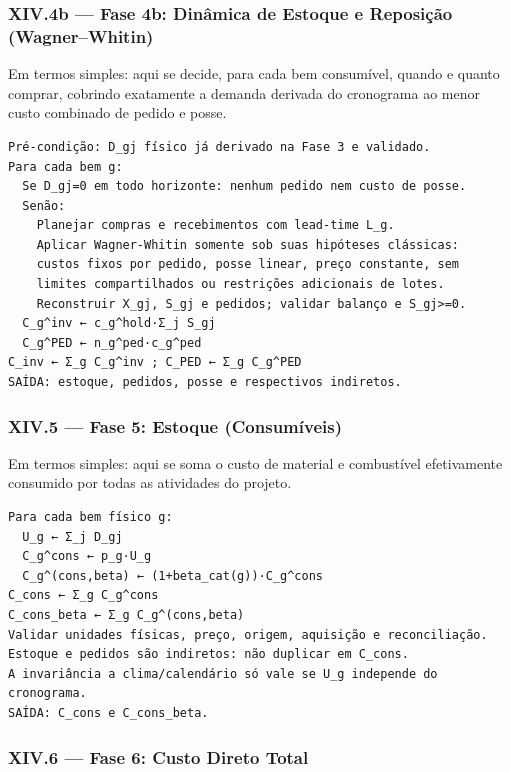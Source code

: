 \documentclass[
  10pt,
]{article}
\begin{document}
\hypertarget{xiv.4b-fase-4b-dinuxe2mica-de-estoque-e-reposiuxe7uxe3o-wagnerwhitin}{%
\subsubsection{XIV.4b --- Fase 4b: Dinâmica de Estoque e Reposição
(Wagner--Whitin)}\label{xiv.4b-fase-4b-dinuxe2mica-de-estoque-e-reposiuxe7uxe3o-wagnerwhitin}}

Em termos simples: aqui se decide, para cada bem consumível, quando e
quanto comprar, cobrindo exatamente a demanda derivada do cronograma ao
menor custo combinado de pedido e posse.

\begin{verbatim}
Pré-condição: D_gj físico já derivado na Fase 3 e validado.
Para cada bem g:
  Se D_gj=0 em todo horizonte: nenhum pedido nem custo de posse.
  Senão:
    Planejar compras e recebimentos com lead-time L_g.
    Aplicar Wagner-Whitin somente sob suas hipóteses clássicas:
    custos fixos por pedido, posse linear, preço constante, sem
    limites compartilhados ou restrições adicionais de lotes.
    Reconstruir X_gj, S_gj e pedidos; validar balanço e S_gj>=0.
  C_g^inv ← c_g^hold·Σ_j S_gj
  C_g^PED ← n_g^ped·c_g^ped
C_inv ← Σ_g C_g^inv ; C_PED ← Σ_g C_g^PED
SAÍDA: estoque, pedidos, posse e respectivos indiretos.
\end{verbatim}

\hypertarget{xiv.5-fase-5-estoque-consumuxedveis}{%
\subsubsection{XIV.5 --- Fase 5: Estoque
(Consumíveis)}\label{xiv.5-fase-5-estoque-consumuxedveis}}

Em termos simples: aqui se soma o custo de material e combustível
efetivamente consumido por todas as atividades do projeto.

\begin{verbatim}
Para cada bem físico g:
  U_g ← Σ_j D_gj
  C_g^cons ← p_g·U_g
  C_g^(cons,beta) ← (1+beta_cat(g))·C_g^cons
C_cons ← Σ_g C_g^cons
C_cons_beta ← Σ_g C_g^(cons,beta)
Validar unidades físicas, preço, origem, aquisição e reconciliação.
Estoque e pedidos são indiretos: não duplicar em C_cons.
A invariância a clima/calendário só vale se U_g independe do cronograma.
SAÍDA: C_cons e C_cons_beta.
\end{verbatim}

\hypertarget{xiv.6-fase-6-custo-direto-total}{%
\subsubsection{XIV.6 --- Fase 6: Custo Direto
Total}\label{xiv.6-fase-6-custo-direto-total}}
\end{document}
